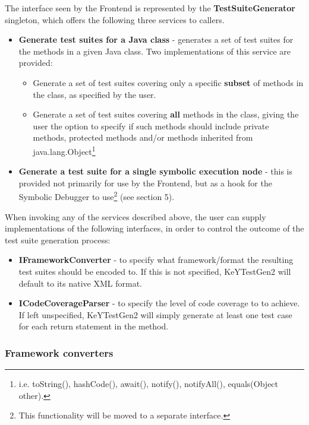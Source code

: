 \documentclass{article}
\newcommand{\tmstrong}[1]{\textbf{#1}}
\newenvironment{itemizedot}{\begin{itemize} \renewcommand{\labelitemi}{$\bullet$}\renewcommand{\labelitemii}{$\bullet$}\renewcommand{\labelitemiii}{$\bullet$}\renewcommand{\labelitemiv}{$\bullet$}}{\end{itemize}}
\newenvironment{itemizeminus}{\begin{itemize} \renewcommand{\labelitemi}{$-$}\renewcommand{\labelitemii}{$-$}\renewcommand{\labelitemiii}{$-$}\renewcommand{\labelitemiv}{$-$}}{\end{itemize}}
\begin{document}
The interface seen by the Frontend is represented by the
{\tmstrong{TestSuiteGenerator}} singleton, which offers the following three
services to callers.
\begin{itemizedot}
  \item {\tmstrong{Generate test suites for a Java class}} - generates a set
  of test suites for the methods in a given Java class. Two implementations of
  this service are provided:
  \begin{itemizeminus}
    \item Generate a set of test suites covering only a specific
    {\tmstrong{subset}} of methods in the class, as specified by the user.
    
    \item Generate a set of test suites covering {\tmstrong{all}} methods in
    the class, giving the user the option to specify if such methods should
    include private methods, protected methods and/or methods inherited from
    java.lang.Object{\footnote{i.e. toString(), hashCode(), await(), notify(),
    notifyAll(), equals(Object other).}}
  \end{itemizeminus}
  \item {\tmstrong{Generate a test suite for a single symbolic execution
  node}} - this is provided not primarily for use by the Frontend, but as a
  hook for the Symbolic Debugger to use{\footnote{This functionality will be
  moved to a separate interface.}} (see section 5).
  
  
\end{itemizedot}
When invoking any of the services described above, the user can supply
implementations of the following interfaces, in order to control the outcome
of the test suite generation process:
\begin{itemizedot}
  \item {\tmstrong{IFrameworkConverter}} - to specify what framework/format
  the resulting test suites should be encoded to. If this is not specified,
  KeYTestGen2 will default to its native XML format.
  
  \item {\tmstrong{ICodeCoverageParser}} - to specify the level of code
  coverage to to achieve. If left unspecified, KeYTestGen2 will simply
  generate at least one test case for each return statement in the method. 
\end{itemizedot}


\subsubsection{Framework converters}
\end{document}
